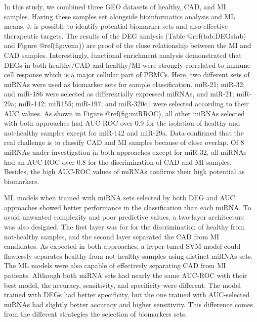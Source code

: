 \documentclass[smallextended]{svjour3}       %
\begin{document}
In this study, we combined three GEO datasets of healthy, CAD, and MI
samples. Having these samples set alongside bioinformatics analysis and
ML means, it is possible to identify potential biomarker sets and also
effective therapeutic targets. The results of the DEG analysis (Table
@ref(tab:DEGstab) and Figure @ref(fig:venn)) are proof of the close
relationship between the MI and CAD samples. Interestingly, functional
enrichment analysis demonstrated that DEGs in both healthy/CAD and
healthy/MI were strongly correlated to immune cell response which is a
major cellular part of PBMCs. Here, two different sets of miRNAs were
used as biomarker sets for sample classification. miR-21; miR-32; and
miR-186 were selected as differentially expressed miRNAs, and miR-21;
miR-29a; miR-142; miR155; miR-197; and miR-320c1 were selected according
to their AUC values. As shown in Figure @ref(fig:miRROC), all other
miRNAs selected with both approaches had AUC-ROC over 0.9 for the
isolation of healthy and not-healthy samples except for miR-142 and
miR-29a. Data confirmed that the real challenge is to classify CAD and
MI samples because of close overlap. Of 8 miRNAs under investigation in
both approaches except for miR-32, all miRNAs had an AUC-ROC over 0.8
for the discrimination of CAD and MI samples. Besides, the high AUC-ROC
values of miRNAs confirms their high potential as biomarkers.

ML models when trained with miRNA sets selected by both DEG and AUC
approaches showed better performance in the classification than each
miRNA. To avoid unwanted complexity and poor predictive values, a
two-layer architecture was also designed. The first layer was for for
the discrimination of healthy from not-healthy samples, and the second
layer separated the CAD from MI candidates. As expected in both
approaches, a hyper-tuned SVM model could flawlessly separates healthy
from not-healthy samples using distinct miRNAs sets. The ML models were
also capable of effectively separating CAD from MI patients. Although
both miRNA sets had nearly the same AUC-ROC with their best model, the
accuracy, sensitivity, and specificity were different. The model trained
with DEGs had better specificity, but the one trained with AUC-selected
miRNAs had slightly better accuracy and higher sensitivity. This
difference comes from the different strategies the selection of
biomarkers sets.
\end{document}
